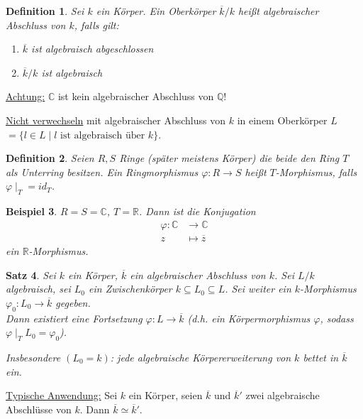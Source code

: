 \documentclass[a4paper,12pt,numbers=noenddot,parskip=full]{scrartcl}
\newcommand{\setQ}{\mathbb{Q}}
\newcommand{\setR}{\mathbb{R}}
\newcommand{\setC}{\mathbb{C}}
\newcommand{\heading}{\underline}
\theoremstyle{dotless}
\newtheorem{theorem}{Satz}[section]
\newtheorem{definition}[theorem]{Definition}
\newtheorem{example}[theorem]{Beispiel}
\theoremstyle{remark}
\begin{document}
		\begin{definition}
			Sei $k$ ein Körper. Ein Oberkörper $\overline{k}/k$ heißt algebraischer Abschluss von $k$, falls gilt:
			\begin{enumerate}
				\item $\overline{k}$ ist algebraisch abgeschlossen
				\item $\overline{k} / k$ ist algebraisch
			\end{enumerate}
		\end{definition}
	
		\heading{Achtung:} $\setC$ ist kein algebraischer Abschluss von $\setQ$!
		
		\heading{Nicht verwechseln} mit algebraischer Abschluss von $k$ in einem Oberkörper $L$ $= \{ l \in L \mid \text{$l$ ist algebraisch über $k$} \}$. 

	\begin{definition}
		Seien $R,S$ Ringe (später meistens Körper) die beide den Ring $T$ als Unterring besitzen.
		Ein Ringmorphismus $\varphi: R \to S$ heißt $T$-Morphismus, falls $\varphi \mid_T = id_T$.
	\end{definition}

	\begin{example}
		$R = S = \setC$, $T = \setR$. Dann ist die Konjugation
		\begin{align*}
			\varphi: \setC &\to \setC \\
			z &\mapsto \overline{z}
		\end{align*}
		ein $\setR$-Morphismus.
	\end{example}

	\begin{theorem}
		\label{thm:schwacherErsatzFürUniverselleEigenschaft}
		Sei $k$ ein Körper, $\overline{k}$ ein algebraischer Abschluss von $k$. Sei $L/k$ algebraisch, sei $L_0$ ein Zwischenkörper $k \subseteq L_0 \subseteq L$. Sei weiter ein $k$-Morphismus $\varphi_0: L_0 \to \overline{k}$ gegeben. \\Dann existiert eine Fortsetzung $\varphi: L \to \overline{k}$ (d.h. ein Körpermorphismus $\varphi$, sodass $\varphi \mid_T{L_0} = \varphi_0$).
		
		Insbesondere $(L_0 = k)$: jede algebraische Körpererweiterung von $k$ bettet in $\overline{k}$ ein.
	\end{theorem}

	\heading{Typische Anwendung:} Sei $k$ ein Körper, seien $\overline{k}$ und $\overline{k}'$ zwei algebraische Abschlüsse von $k$. Dann $\overline{k} \simeq \overline{k}'$.
	
\end{document}
